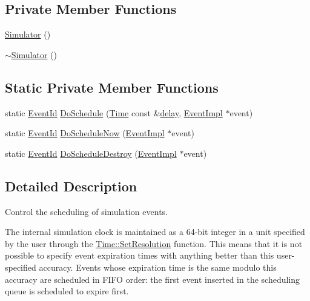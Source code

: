 \subsection*{Private Member Functions}
\begin{DoxyCompactItemize}
\item 
\hyperlink{classns3_1_1Simulator_a241c69c7840fa7d4e515342565c65d95}{Simulator} ()
\item 
\hyperlink{classns3_1_1Simulator_aecdbd34e08278562bcbf675832d6caea}{$\sim$\+Simulator} ()
\end{DoxyCompactItemize}
\subsection*{Static Private Member Functions}
\begin{DoxyCompactItemize}
\item 
static \hyperlink{classns3_1_1EventId}{Event\+Id} \hyperlink{classns3_1_1Simulator_a47af23973938819bdc89cb2807e09ed5}{Do\+Schedule} (\hyperlink{classns3_1_1Time}{Time} const \&\hyperlink{mmwave_2model_2fading-traces_2fading__trace__generator_8m_a7964e6aa8f61a9d28973c8267a606ad8}{delay}, \hyperlink{classns3_1_1EventImpl}{Event\+Impl} $\ast$event)
\item 
static \hyperlink{classns3_1_1EventId}{Event\+Id} \hyperlink{classns3_1_1Simulator_a9377ee62d67f7923318c4313a3b285f8}{Do\+Schedule\+Now} (\hyperlink{classns3_1_1EventImpl}{Event\+Impl} $\ast$event)
\item 
static \hyperlink{classns3_1_1EventId}{Event\+Id} \hyperlink{classns3_1_1Simulator_a00139c9c4e854aca72063485518c0d52}{Do\+Schedule\+Destroy} (\hyperlink{classns3_1_1EventImpl}{Event\+Impl} $\ast$event)
\end{DoxyCompactItemize}


\subsection{Detailed Description}
Control the scheduling of simulation events. 

The internal simulation clock is maintained as a 64-\/bit integer in a unit specified by the user through the \hyperlink{classns3_1_1Time_ac89165ba7715b66017a49c718f4aef09}{Time\+::\+Set\+Resolution} function. This means that it is not possible to specify event expiration times with anything better than this user-\/specified accuracy. Events whose expiration time is the same modulo this accuracy are scheduled in F\+I\+FO order\+: the first event inserted in the scheduling queue is scheduled to expire first.


